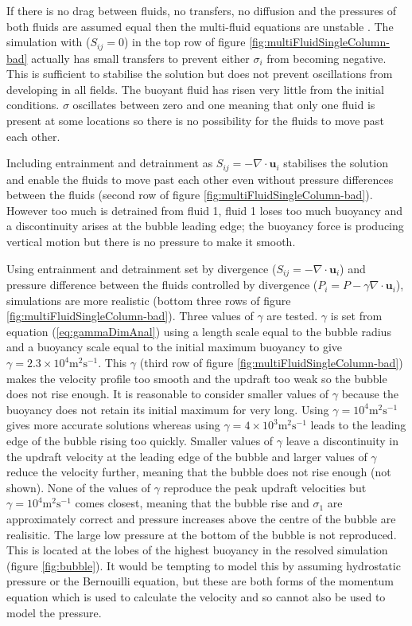 \documentclass[draft]{agujournal2019}
\begin{document}
If there is no drag between fluids, no transfers, no diffusion and
the pressures of both fluids are assumed equal then the multi-fluid
equations are unstable \cite{TEB19}. The simulation with ($S_{ij}=0$)
in the top row of figure \ref{fig:multiFluidSingleColumn-bad} actually
has small transfers to prevent either $\sigma_{i}$ from becoming
negative. This is sufficient to stabilise the solution but does not
prevent oscillations from developing in all fields. The buoyant fluid
has risen very little from the initial conditions. $\sigma$ oscillates
between zero and one meaning that only one fluid is present at some
locations so there is no possibility for the fluids to move past each
other.

Including entrainment and detrainment as $S_{ij}=-\nabla\cdot\mathbf{u}_{i}$
stabilises the solution and enable the fluids to move past each other
even without pressure differences between the fluids (second row of
figure \ref{fig:multiFluidSingleColumn-bad}). However too much is
detrained from fluid 1, fluid 1 loses too much buoyancy and a discontinuity
arises at the bubble leading edge; the buoyancy force is producing
vertical motion but there is no pressure to make it smooth. 

Using entrainment and detrainment set by divergence ($S_{ij}=-\nabla\cdot\mathbf{u}_{i}$)
and pressure difference between the fluids controlled by divergence
($P_{i}=P-\gamma\nabla\cdot\mathbf{u}_{i}$),  simulations are more
realistic (bottom three rows of figure \ref{fig:multiFluidSingleColumn-bad}).
Three values of $\gamma$ are tested. $\gamma$ is set from equation
(\ref{eq:gammaDimAnal}) using a length scale equal to the bubble
radius and a buoyancy scale equal to the initial maximum buoyancy
to give $\gamma=2.3\times10^{4}\text{m}^{2}\text{s}^{-1}$. This $\gamma$
(third row of figure \ref{fig:multiFluidSingleColumn-bad}) makes
the velocity profile too smooth and the updraft too weak so the
bubble does not rise enough. It is reasonable to consider smaller
values of $\gamma$ because the buoyancy does not retain its initial
maximum for very long. Using $\gamma=10^{4}\text{m}^{2}\text{s}^{-1}$
gives more accurate solutions whereas using $\gamma=4\times10^{3}\text{m}^{2}\text{s}^{-1}$
leads to the leading edge of the bubble rising too quickly. Smaller
values of $\gamma$ leave a discontinuity in the updraft velocity
at the leading edge of the bubble and larger values of $\gamma$ reduce
the velocity further, meaning that the bubble does not rise enough
(not shown). None of the values of $\gamma$ reproduce the peak updraft
velocities but $\gamma=10^{4}\text{m}^{2}\text{s}^{-1}$ comes closest,
meaning that the bubble rise and $\sigma_{1}$ are approximately correct
and pressure increases above the centre of the bubble are realisitic.
The large low pressure at the bottom of the bubble is not reproduced.
This is located at the lobes of the highest buoyancy in the resolved
simulation (figure \ref{fig:bubble}). It would be tempting to model
this by assuming hydrostatic pressure or the Bernouilli equation,
but these are both forms of the momentum equation which is used to
calculate the velocity and so cannot also be used to model the pressure. 
\end{document}
